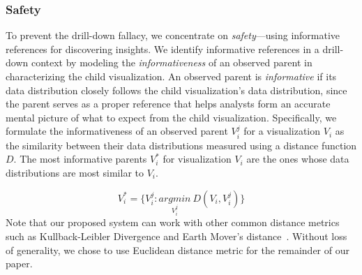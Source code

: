 \subsubsection{Safety}
To prevent the drill-down fallacy, we concentrate on \emph{safety}---using informative references for discovering insights. We identify informative references in a drill-down context by modeling the \emph{informativeness} of an observed parent in characterizing the child visualization. An observed parent is \emph{informative} if its data distribution closely follows the child visualization's data distribution, since the parent serves as a proper reference that helps analysts form an accurate mental picture of what to expect from the child visualization. Specifically, we formulate the informativeness of an observed parent $V_i^j$ for a visualization $V_i$ as the similarity between their data distributions measured using a distance function $D$.  The most informative parents $V_i^*$ for visualization $V_i$ are the ones whose data distributions are most similar to $V_i$.

\begin{equation}
    V_i^*=\{V_i^j : \underset{V_i^j}{argmin}\ D(V_i, V_i^j)\}
\end{equation}
Note that our proposed system can work with other common distance metrics such as Kullback-Leibler Divergence and Earth Mover's distance~\cite{Vartak2015}. Without loss of generality, we chose to use Euclidean distance metric for the remainder of our paper.

